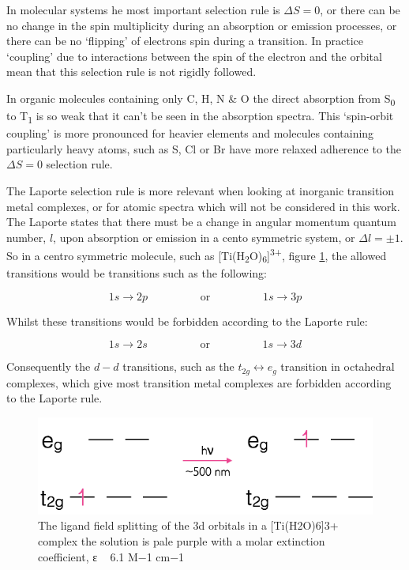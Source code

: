 \documentclass[
]{book}
\begin{document}
In molecular systems he most important selection rule is \(\Delta S = 0\), or there can be no change in the spin multiplicity during an absorption or emission processes, or there can be no `flipping' of electrons spin during a transition. In practice `coupling' due to interactions between the spin of the electron and the orbital mean that this selection rule is not rigidly followed.

In organic molecules containing only C, H, N \& O the direct absorption from S\textsubscript{0} to T\textsubscript{1} is so weak that it can't be seen in the absorption spectra. This `spin-orbit coupling' is more pronounced for heavier elements and molecules containing particularly heavy atoms, such as S, Cl or Br have more relaxed adherence to the \(\Delta S = 0\) selection rule.

The Laporte selection rule is more relevant when looking at inorganic transition metal complexes, or for atomic spectra which will not be considered in this work. The Laporte states that there must be a change in angular momentum quantum number, \(l\), upon absorption or emission in a cento symmetric system, or \(\Delta l = \pm 1\). So in a centro symmetric molecule, such as {[}Ti(H\textsubscript{2}O)\textsubscript{6}{]}\textsuperscript{3+}, figure \ref{fig:Tisplitting}, the allowed transitions would be transitions such as the following:

\begin{equation*}
1s \longrightarrow 2p \hspace{2cm}\textrm{or} \hspace{2cm} 1s \longrightarrow 3p
\end{equation*}

Whilst these transitions would be forbidden according to the Laporte rule:

\begin{equation*}
1s \longrightarrow 2s \hspace{2cm}\textrm{or} \hspace{2cm} 1s \longrightarrow 3d
\end{equation*}

Consequently the \(d-d\) transitions, such as the \(t_{2g} \longleftrightarrow e_g\) transition in octahedral complexes, which give most transition metal complexes are forbidden according to the Laporte rule.

\begin{figure}

{\centering \includegraphics[width=0.6\linewidth]{images/Ti3splitting} 

}

\caption{The ligand field splitting of the 3d orbitals in a  [Ti(H2O)6]3+ complex the solution is pale purple with a molar extinction coefficient, ε ~ 6.1 M−1 cm−1}\label{fig:Tisplitting}
\end{figure}
\end{document}

